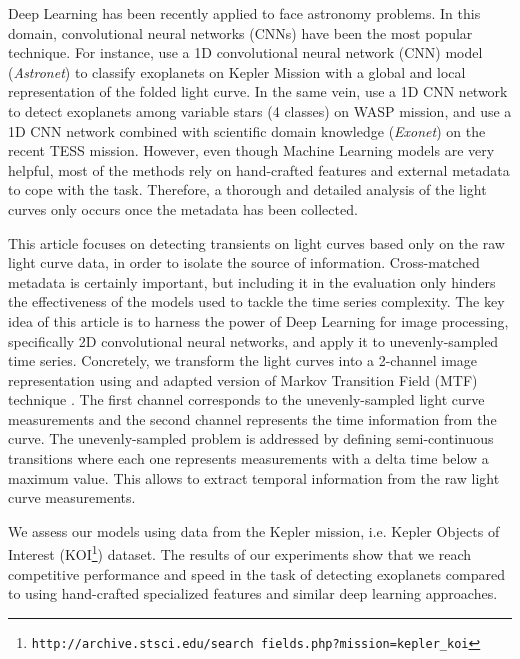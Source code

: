 Deep Learning has been recently applied to face astronomy problems. In this domain, convolutional neural networks (CNNs) have been the most popular technique. For instance, \citet{shallue2018identifying} use a 1D convolutional neural network (CNN) model (\textit{Astronet}) to classify exoplanets on Kepler Mission with a global and local representation of the folded light curve. In the same vein, \citet{schanche2019machine} use a 1D CNN network to detect exoplanets among variable stars (4 classes) on WASP mission, and \citet{osborn2020rapid} use a 1D CNN network combined with scientific domain knowledge \citep{ansdell2018scientific} (\textit{Exonet}) on the recent TESS mission.
However, even though Machine Learning models are very helpful, most of the methods rely on hand-crafted features and external metadata to cope with the task. Therefore, a thorough and detailed analysis of the light curves only occurs once the metadata has been collected. 

This article focuses on detecting transients on light curves based only on the raw light curve data, in order to isolate the source of information. Cross-matched metadata is certainly important, but including it in the evaluation only hinders the effectiveness of the models used to tackle the time series complexity. The key idea of this article is to harness the power of Deep Learning for image processing, specifically 2D convolutional neural networks, and apply it to unevenly-sampled time series.
Concretely, we transform the light curves into a 2-channel image representation using and adapted version of Markov Transition Field (MTF) technique \citep{wang2015imaging}.
The first channel corresponds to the unevenly-sampled light curve measurements and the second channel represents the time information from the curve. The unevenly-sampled problem is addressed by defining semi-continuous transitions where each one represents measurements with a delta time below a maximum value.
This allows to extract temporal information from the raw light curve measurements. 

We assess our models using data from the Kepler mission, i.e. Kepler Objects of Interest (KOI\footnote{\texttt{http://archive.stsci.edu/search fields.php?mission=kepler\_koi}}) dataset. 
The results of our experiments show that we reach competitive performance and speed in the task of detecting exoplanets compared to using hand-crafted specialized features and similar deep learning approaches. 

